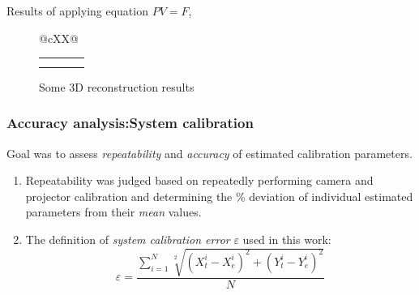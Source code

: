 \documentclass[9pt]{beamer}
\begin{document}
\begin{frame}
Results of applying equation $PV=F$,
\begin{figure}
\begin{tabularx}{\linewidth}{@{}cXX@{}}
\begin{tabular}{c c c c}
\hspace{-0.3cm}\subfloat[2D face image]{\texttt{[image: ../Thesis\_work/Latex\_thesis\_work/img\_source/face\_2d.png]}} & 
\hspace{-0.3cm}\subfloat[3D reconstruction of face]{\texttt{[image: ../Thesis\_work/Latex\_thesis\_work/img\_source/face\_3d.png]}} &
\hspace{-0.3cm}\subfloat[2D image of box in front of wall]{\texttt{[image: ../Thesis\_work/Latex\_thesis\_work/img\_source/box\_wall\_2d.png]}} & 
\hspace{-0.3cm}\subfloat[3D reconstruction of box in front of wall]{\texttt{[image: ../Thesis\_work/Latex\_thesis\_work/img\_source/box\_wall\_3d.png]}}\\
\hspace{-0.3cm}\subfloat[2D image of a chair with background]{\texttt{[image: ../Thesis\_work/Latex\_thesis\_work/img\_source/chair\_2d.png]}} &
\hspace{-0.3cm}\subfloat[3D reconstruction of chair with background]{\texttt{[image: ../Thesis\_work/Latex\_thesis\_work/img\_source/chair\_reconstruction.png]}} &
\hspace{-0.3cm}\subfloat[A cup]{\texttt{[image: ../Thesis\_work/Latex\_thesis\_work/img\_source/cup\_2d.png]}} &
\hspace{-0.3cm}\subfloat[3D reconstruction of cup]{\texttt{[image: ../Thesis\_work/Latex\_thesis\_work/img\_source/cup\_3d.png]}}\\ 
\end{tabular}
\end{tabularx}
\caption{Some 3D reconstruction results}
\end{figure}
\end{frame}
\begin{frame}
\frametitle{Accuracy analysis:System calibration}
Goal was to assess \textit{repeatability} and \textit{accuracy} of estimated calibration parameters.
\begin{enumerate}
\item Repeatability was judged based on repeatedly performing camera and projector calibration and determining the \% deviation of individual estimated parameters from their \textit{mean} values.
\item The definition of \textit{system calibration error} $\varepsilon$ used in this work:
\begin{equation}
\varepsilon=\frac{\sum_{i=1}^N\sqrt[2]{(X_t^i-X_e^i)^2+(Y_t^i-Y_e^i)^2}}{N}
\end{equation}
\end{enumerate}
\end{frame}
\end{document}
